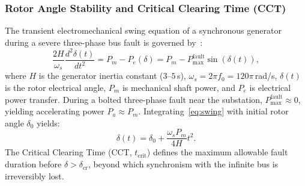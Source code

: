 \documentclass[journal]{IEEEtran}
\begin{document}
\subsubsection{Rotor Angle Stability and Critical Clearing Time (CCT)}
The transient electromechanical swing equation of a synchronous generator during a severe three-phase bus fault is governed by~\cite{kundur1994power}:
\begin{equation}
\frac{2H}{\omega_s} \frac{d^2 \delta(t)}{dt^2} = P_m - P_e(\delta) = P_m - P_{\max}^{\text{fault}} \sin(\delta(t)),
\label{eq:swing}
\end{equation}
where $H$ is the generator inertia constant ($3\text{--}5$\,s), $\omega_s = 2\pi f_0 = 120\pi$\,rad/s, $\delta(t)$ is the rotor electrical angle, $P_m$ is mechanical shaft power, and $P_e$ is electrical power transfer. During a bolted three-phase fault near the substation, $P_{\max}^{\text{fault}} \approx 0$, yielding accelerating power $P_a \approx P_m$. Integrating~\eqref{eq:swing} with initial rotor angle $\delta_0$ yields:
\begin{equation}
\delta(t) = \delta_0 + \frac{\omega_s P_m}{4H} t^2.
\end{equation}
The Critical Clearing Time (CCT, $t_{\text{crit}}$) defines the maximum allowable fault duration before $\delta > \delta_{\text{cr}}$, beyond which synchronism with the infinite bus is irreversibly lost.
\end{document}
